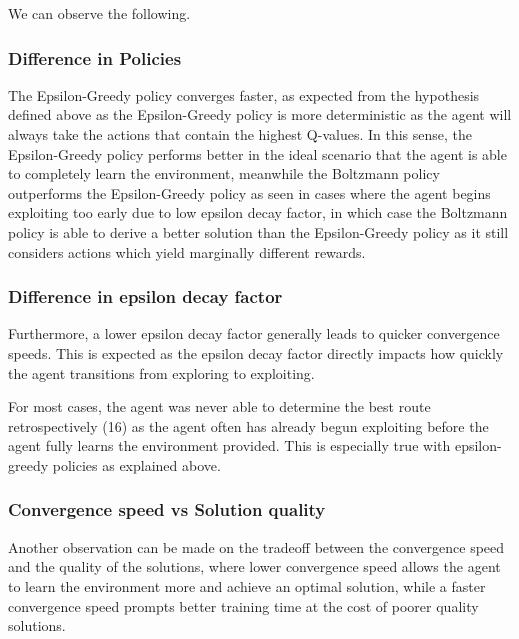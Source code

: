 We can observe the following.
\subsubsection{Difference in Policies}
The Epsilon-Greedy policy converges faster, as expected from the hypothesis defined above as the Epsilon-Greedy policy is more deterministic as the agent will always take the actions that contain the highest Q-values.  In this sense, the Epsilon-Greedy policy performs better in the ideal scenario that the agent is able to completely learn the environment, meanwhile the Boltzmann policy outperforms the Epsilon-Greedy policy as seen in cases where the agent begins exploiting too early due to low epsilon decay factor, in which case the Boltzmann policy is able to derive a better solution than the Epsilon-Greedy policy as it still considers actions which yield marginally different rewards.

\subsubsection{Difference in epsilon decay factor}
Furthermore, a lower epsilon decay factor generally leads to quicker convergence speeds. This is expected as the epsilon decay factor directly impacts how quickly the agent transitions from exploring to exploiting. 

For most cases, the agent was never able to determine the best route retrospectively (16) as the agent often has already begun exploiting before the agent fully learns the environment provided. This is especially true with epsilon-greedy policies as explained above. 

\subsubsection{Convergence speed vs Solution quality}
Another observation can be made on the tradeoff between the convergence speed and the quality of the solutions, where lower convergence speed allows the agent to learn the environment more and achieve an optimal solution, while a faster convergence speed prompts better training time at the cost of poorer quality solutions.

